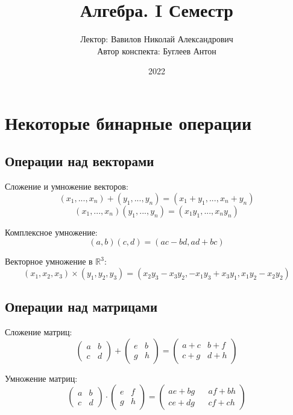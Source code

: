 \documentclass[a4paper, 14pt]{article}
\title{Алгебра. I Семестр}
\author{Лектор: Вавилов Николай Александрович \\
        Автор конспекта: Буглеев Антон}
\date{2022}
\begin{document}
    \maketitle
    \newpage

    \section{Некоторые бинарные операции}
    \subsection*{Операции над векторами}
    Сложение и умножение векторов: 
    \[(x_1, ..., x_n) + (y_1, ..., y_n) = (x_1 + y_1, ..., x_n + y_n)\]
    \[(x_1, ..., x_n)(y_1, ..., y_n) = (x_1y_1, ..., x_ny_n)\]

    Комплексное умножение:
    \[(a,b)(c,d) = (ac - bd, ad+bc)\]

    Векторное умножение в $\mathbb{R}^3$:    
    \[ (x_1,x_2,x_3) \times (y_1,y_2,y_3) = (x_2y_3 - x_3y_2, -x_1y_3 + x_3y_1, x_1y_2 - x_2y_2)\]
    

    \subsection*{Операции над матрицами}
    Сложение матриц:
    \[
    \begin{pmatrix}
        a & b \\
        c & d
    \end{pmatrix}
    +
    \begin{pmatrix}
        e & b \\
        g & h
    \end{pmatrix}
    =
    \begin{pmatrix}
        a+c & b+f \\
        c+g & d + h
    \end{pmatrix}
    \]

    Умножение матриц:
    \[
        \begin{pmatrix}
            a & b \\
            c & d    
        \end{pmatrix}
        \cdot
        \begin{pmatrix}
            e & f \\
            g & h
        \end{pmatrix}
        =
        \begin{pmatrix}
            ae+bg && af+bh \\
            ce+dg && cf+ch
        \end{pmatrix}
    \]
    
\end{document}
